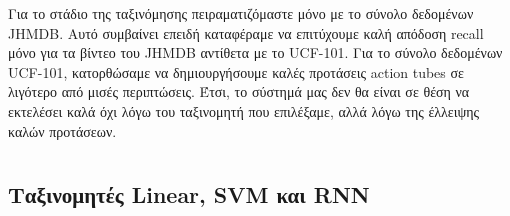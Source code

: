 Για το στάδιο της ταξινόμησης πειραματιζόμαστε μόνο με το σύνολο δεδομένων \en JHMDB\gr. Αυτό συμβαίνει επειδή καταφέραμε να επιτύχουμε καλή απόδοση \en recall \gr μόνο για τα βίντεο του \en JHMDB \gr
 αντίθετα με το \en UCF-101\gr. Για το σύνολο δεδομένων \en UCF-101\gr, κατορθώσαμε να δημιουργήσουμε καλές προτάσεις \en action tubes \gr σε λιγότερο από μισές περιπτώσεις.
Έτσι, το σύστημά μας δεν θα είναι σε θέση να εκτελέσει καλά όχι λόγω του ταξινομητή που επιλέξαμε, αλλά λόγω της έλλειψης καλών προτάσεων.  
\section{}
\subsection{Ταξινομητές \en Linear, SVM  \gr και  \en RNN \gr}


